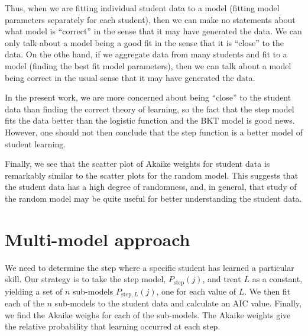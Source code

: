 \documentclass{acmlarge-edm}
\begin{document}
Thus, when we are fitting individual student data to a model (fitting
model parameters separately for each student), then we can make no
statements about what model is ``correct'' in the sense that it may
have generated the data.  We can only talk about a model being a good
fit in the sense that it is ``close'' to the data.
On the othe hand, if we aggregate data from many students and fit to a
model (finding the best fit model parameters), then we can talk about
a model being correct in the usual sense  that it may have generated
the data.

In the present work, we are more concerned about being ``close'' to
the student data than finding the correct theory of learning, so the
fact that the step model fits the data better than the logistic function and
the BKT model is good news.  However, one should not then conclude
that the step function is a better model of student learning.

Finally, we see that the scatter plot of Akaike weights for student
data is remarkably similar to the scatter plots for the random model.
This suggests that the student data has a high degree of randomness,
and, in general, that study of the random model may be quite useful for better
understanding the student data.


\section{Multi-model approach}
\label{multi-model}

We need to determine the step where a specific student has learned a
particular skill.  Our strategy is to take the step model, 
$P_\mathrm{step}(j)$, and treat $L$ as a constant, yielding a set of $n$ 
sub-models $P_{\mathrm{step},L}(j)$, one for each value of $L$.
We then fit each of the $n$ sub-models to the student data and
calculate an AIC value.  Finally, we find the Akaike weighs for each of the
sub-models.  The Akaike weights give the relative probability that learning
occurred at each step.
\end{document}
